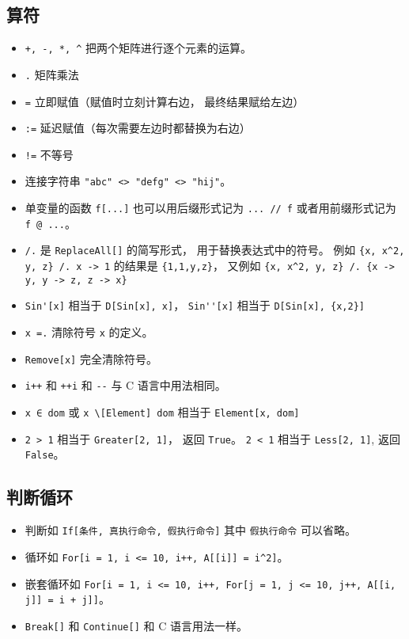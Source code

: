 \subsection{算符}
\begin{itemize}
\item \verb|+, -, *, ^| 把两个矩阵进行逐个元素的运算。
\item \verb|.| 矩阵乘法
\item \verb|=| 立即赋值（赋值时立刻计算右边， 最终结果赋给左边）
\item \verb|:=| 延迟赋值（每次需要左边时都替换为右边）
\item \verb|!=| 不等号
\item 连接字符串 \verb|"abc" <> "defg" <> "hij"|。
\item 单变量的函数 \verb|f[...]| 也可以用后缀形式记为 \verb|... // f| 或者用前缀形式记为 \verb|f @ ...|。
\item \verb|/.| 是 \verb|ReplaceAll[]| 的简写形式， 用于替换表达式中的符号。 例如 \verb|{x, x^2, y, z} /. x -> 1| 的结果是 \verb|{1,1,y,z}|， 又例如 \verb|{x, x^2, y, z} /. {x -> y, y -> z, z -> x}|
\item \verb|Sin'[x]| 相当于 \verb|D[Sin[x], x]|， \verb|Sin''[x]| 相当于 \verb|D[Sin[x], {x,2}]|
\item \verb|x =.| 清除符号 \verb|x| 的定义。
\item \verb|Remove[x]| 完全清除符号。
\item \verb|i++| 和 \verb|++i| 和 \verb|--| 与 C 语言中用法相同。
\item \verb|x ∈ dom| 或 \verb|x \[Element] dom| 相当于 \verb|Element[x, dom]|
\item \verb|2 > 1| 相当于 \verb|Greater[2, 1]|， 返回 \verb|True|。 \verb|2 < 1| 相当于 \verb|Less[2, 1]|, 返回 \verb|False|。
\end{itemize}

\subsection{判断循环}
\begin{itemize}
\item 判断如 \verb|If[条件, 真执行命令, 假执行命令]| 其中 \verb|假执行命令| 可以省略。
\item 循环如 \verb|For[i = 1, i <= 10, i++, A[[i]] = i^2]|。
\item 嵌套循环如 \verb|For[i = 1, i <= 10, i++, For[j = 1, j <= 10, j++, A[[i, j]] = i + j]]|。
\item \verb|Break[]| 和 \verb|Continue[]| 和 C 语言用法一样。
\end{itemize}

